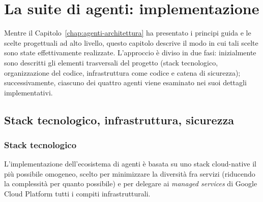
\chapter{La suite di agenti: implementazione}
\label{chap:agenti-implementazione}

Mentre il Capitolo~\ref{chap:agenti-architettura} ha presentato i principi guida
e le scelte progettuali ad alto livello, questo capitolo descrive il modo in cui
tali scelte sono state effettivamente realizzate. L'approccio è diviso in due fasi: 
inizialmente sono descritti gli elementi trasversali del progetto (stack
tecnologico, organizzazione del codice, infrastruttura come codice e catena di
sicurezza); successivamente, ciascuno dei quattro agenti viene esaminato nei
suoi dettagli implementativi.

\section{Stack tecnologico, infrastruttura, sicurezza}
\label{sec:agenti-stack}

\subsection{Stack tecnologico}
\label{subsec:agenti-stack-tech}

L'implementazione dell'ecosistema di agenti è basata su uno stack cloud-native
il più possibile omogeneo, scelto per minimizzare la diversità fra servizi (riducendo la complessità
per quanto possibile) e per delegare ai \emph{managed services} di Google Cloud Platform tutti i compiti
infrastrutturali.

